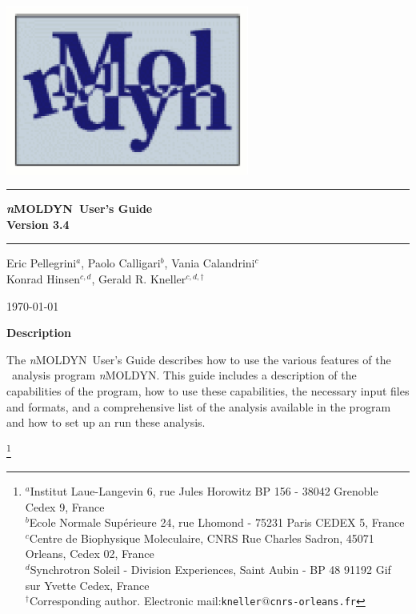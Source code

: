 \documentclass[a4paper,11pt]{report}
\newcommand{\NMOLDYN}{\textit{n}MOLDYN}
\begin{document}
\begin{titlepage}

\begin{center}

\includegraphics[width=0.60\textwidth]{./Figures/logo.eps}

\vspace{2cm}
 
\hrule height 0.1cm
\vspace{0.5cm}
{\Huge \bfseries \NMOLDYN\ User's Guide}\\
\vspace{0.5cm}
{\huge \bfseries Version 3.4}
\vspace{0.5cm}
\hrule height 0.1cm

\vspace{1.5cm}

{\Large Eric Pellegrini$^{a}$, Paolo Calligari$^{b}$, Vania Calandrini$^{c}$}\\
\vspace{0.5cm}
{\Large Konrad Hinsen$^{c,d}$, Gerald R. Kneller$^{c,d,\dag}$}\\

\vspace{1.0cm}
 
{\large \today}\\

\vspace{1.0cm}

{\large \textbf{Description}}\\

\end{center}

\noindent The \NMOLDYN\ User's Guide describes how to use the various features of the \MD\ analysis program 
\NMOLDYN. This guide includes a description of the capabilities of the program, how to use these capabilities, the necessary 
input files and formats, and a comprehensive list of the analysis available in the program and how to set up an run these analysis.

\footnote{$^{a}$Institut Laue-Langevin 6, rue Jules Horowitz BP 156 - 38042 Grenoble Cedex 9, France\\
$^{b}$Ecole Normale Sup\'erieure 24, rue Lhomond - 75231 Paris CEDEX 5, France\\
$^{c}$Centre de Biophysique Moleculaire, CNRS Rue Charles Sadron, 45071 Orleans, Cedex 02, France\\
$^{d}$Synchrotron Soleil - Division Experiences, Saint Aubin - BP 48 91192 Gif sur Yvette Cedex, France\\
$^{\dag}$Corresponding author. Electronic mail:{\tt kneller$@$cnrs-orleans.fr}}

\end{titlepage}
\end{document}
